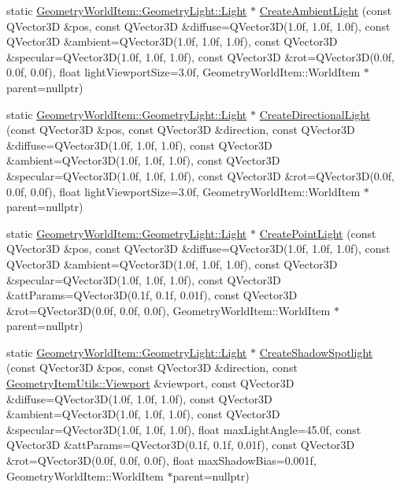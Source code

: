 \begin{DoxyCompactItemize}
\item 
static \mbox{\hyperlink{class_geometry_engine_1_1_geometry_world_item_1_1_geometry_light_1_1_light}{Geometry\+World\+Item\+::\+Geometry\+Light\+::\+Light}} $\ast$ \mbox{\hyperlink{class_geometry_engine_1_1_geometry_factory_a6d12044e0bc41b8c2ed39d52e6ab2e95}{Create\+Ambient\+Light}} (const Q\+Vector3D \&pos, const Q\+Vector3D \&diffuse=Q\+Vector3D(1.\+0f, 1.\+0f, 1.\+0f), const Q\+Vector3\+D \&ambient=\+Q\+Vector3\+D(1.\+0f, 1.\+0f, 1.\+0f), const Q\+Vector3\+D \&specular=\+Q\+Vector3\+D(1.\+0f, 1.\+0f, 1.\+0f), const Q\+Vector3\+D \&rot=\+Q\+Vector3\+D(0.\+0f, 0.\+0f, 0.\+0f), float light\+Viewport\+Size=3.\+0f, Geometry\+World\+Item\+::\+World\+Item $\ast$parent=nullptr)
\item 
static \mbox{\hyperlink{class_geometry_engine_1_1_geometry_world_item_1_1_geometry_light_1_1_light}{Geometry\+World\+Item\+::\+Geometry\+Light\+::\+Light}} $\ast$ \mbox{\hyperlink{class_geometry_engine_1_1_geometry_factory_a045eed55a130fde5a5581e8ef4fd14e1}{Create\+Directional\+Light}} (const Q\+Vector3D \&pos, const Q\+Vector3D \&direction, const Q\+Vector3D \&diffuse=Q\+Vector3D(1.\+0f, 1.\+0f, 1.\+0f), const Q\+Vector3\+D \&ambient=\+Q\+Vector3\+D(1.\+0f, 1.\+0f, 1.\+0f), const Q\+Vector3\+D \&specular=\+Q\+Vector3\+D(1.\+0f, 1.\+0f, 1.\+0f), const Q\+Vector3\+D \&rot=\+Q\+Vector3\+D(0.\+0f, 0.\+0f, 0.\+0f), float light\+Viewport\+Size=3.\+0f, Geometry\+World\+Item\+::\+World\+Item $\ast$parent=nullptr)
\item 
static \mbox{\hyperlink{class_geometry_engine_1_1_geometry_world_item_1_1_geometry_light_1_1_light}{Geometry\+World\+Item\+::\+Geometry\+Light\+::\+Light}} $\ast$ \mbox{\hyperlink{class_geometry_engine_1_1_geometry_factory_a8edc2348bd6ece53626d80690b84b725}{Create\+Point\+Light}} (const Q\+Vector3D \&pos, const Q\+Vector3D \&diffuse=Q\+Vector3D(1.\+0f, 1.\+0f, 1.\+0f), const Q\+Vector3\+D \&ambient=\+Q\+Vector3\+D(1.\+0f, 1.\+0f, 1.\+0f), const Q\+Vector3\+D \&specular=\+Q\+Vector3\+D(1.\+0f, 1.\+0f, 1.\+0f), const Q\+Vector3\+D \&att\+Params=\+Q\+Vector3\+D(0.\+1f, 0.\+1f, 0.\+01f), const Q\+Vector3\+D \&rot=\+Q\+Vector3\+D(0.\+0f, 0.\+0f, 0.\+0f), Geometry\+World\+Item\+::\+World\+Item $\ast$parent=nullptr)
\item 
static \mbox{\hyperlink{class_geometry_engine_1_1_geometry_world_item_1_1_geometry_light_1_1_light}{Geometry\+World\+Item\+::\+Geometry\+Light\+::\+Light}} $\ast$ \mbox{\hyperlink{class_geometry_engine_1_1_geometry_factory_a32cea0a4ef0b019db75039d1b64372fd}{Create\+Shadow\+Spotlight}} (const Q\+Vector3D \&pos, const Q\+Vector3D \&direction, const \mbox{\hyperlink{class_geometry_engine_1_1_geometry_item_utils_1_1_viewport}{Geometry\+Item\+Utils\+::\+Viewport}} \&viewport, const Q\+Vector3D \&diffuse=Q\+Vector3D(1.\+0f, 1.\+0f, 1.\+0f), const Q\+Vector3\+D \&ambient=\+Q\+Vector3\+D(1.\+0f, 1.\+0f, 1.\+0f), const Q\+Vector3\+D \&specular=\+Q\+Vector3\+D(1.\+0f, 1.\+0f, 1.\+0f), float max\+Light\+Angle=45.\+0f, const Q\+Vector3\+D \&att\+Params=\+Q\+Vector3\+D(0.\+1f, 0.\+1f, 0.\+01f), const Q\+Vector3\+D \&rot=\+Q\+Vector3\+D(0.\+0f, 0.\+0f, 0.\+0f), float max\+Shadow\+Bias=0.\+001f, Geometry\+World\+Item\+::\+World\+Item $\ast$parent=nullptr)

\end{DoxyCompactItemize}

